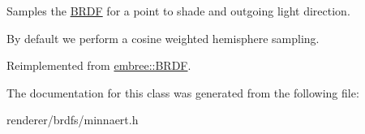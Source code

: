 Samples the \hyperlink{classembree_1_1_b_r_d_f}{BRDF} for a point to shade and outgoing light direction. 

By default we perform a cosine weighted hemisphere sampling. 

Reimplemented from \hyperlink{classembree_1_1_b_r_d_f_a6eb1a114a4f36dc2c1ad65bcbce5f809}{embree::BRDF}.



The documentation for this class was generated from the following file:\begin{DoxyCompactItemize}
\item 
renderer/brdfs/minnaert.h\end{DoxyCompactItemize}

